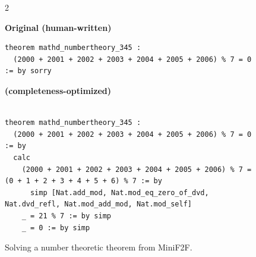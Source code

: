 \setlength{\columnsep}{0.2cm}
\begin{figure}[ht]
\begin{multicols}{2}

{
\textbf{Original (human-written)}
\begin{scriptsize}
\begin{lstlisting}[basicstyle=\scriptsize\ttfamily]
theorem mathd_numbertheory_345 :
  (2000 + 2001 + 2002 + 2003 + 2004 + 2005 + 2006) % 7 = 0 := by sorry

\end{lstlisting}
\end{scriptsize}
}
\vfill\null
\columnbreak
{
\textbf{\methodname{} (completeness-optimized)}
\begin{scriptsize}
\begin{lstlisting}[basicstyle=\scriptsize\ttfamily]

theorem mathd_numbertheory_345 :
  (2000 + 2001 + 2002 + 2003 + 2004 + 2005 + 2006) % 7 = 0   := by
  calc
    (2000 + 2001 + 2002 + 2003 + 2004 + 2005 + 2006) % 7 = (0 + 1 + 2 + 3 + 4 + 5 + 6) % 7 := by
      simp [Nat.add_mod, Nat.mod_eq_zero_of_dvd, Nat.dvd_refl, Nat.mod_add_mod, Nat.mod_self]
    _ = 21 % 7 := by simp
    _ = 0 := by simp
\end{lstlisting}
\end{scriptsize}
}
\end{multicols}
\vspace{-2.5em}
\caption{Solving a number theoretic theorem from MiniF2F.}
\vspace{-1em}
\label{fig:ex3-F2F-completion}
\end{figure}



